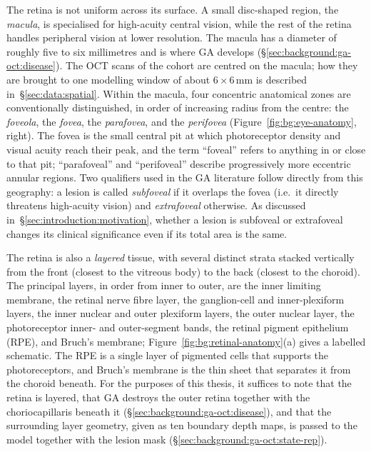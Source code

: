The retina is not uniform across its surface. A small disc-shaped
region, the \emph{macula}, is specialised for
high-acuity central vision, while the rest of the retina handles
peripheral vision at lower resolution. The macula has a diameter of
roughly five to six millimetres and is where GA develops
(\S\ref{sec:background:ga-oct:disease}). The OCT scans of the cohort are
centred on the macula; how they are brought to one modelling window of
about $6 \times 6$\,mm is described in~\S\ref{sec:data:spatial}. Within the macula, four
concentric anatomical zones are conventionally distinguished, in
order of increasing radius from the centre: the \emph{foveola}, the
\emph{fovea}, the \emph{parafovea}, and the \emph{perifovea}
(Figure~\ref{fig:bg:eye-anatomy}, right). The fovea is the small
central pit at which photoreceptor density and visual acuity reach
their peak, and the term ``foveal'' refers to anything in or close to
that pit; ``parafoveal'' and ``perifoveal'' describe progressively
more eccentric annular regions. Two qualifiers used in the GA
literature follow directly from this geography: a lesion is called
\emph{subfoveal} if it overlaps the fovea (i.e.\ it directly threatens
high-acuity vision) and \emph{extrafoveal} otherwise. As discussed
in~\S\ref{sec:introduction:motivation}, whether a lesion is subfoveal or
extrafoveal changes its clinical significance even if its
total area is the same.

The retina is also a \emph{layered} tissue, with several distinct
strata stacked vertically from the front (closest to the vitreous
body) to the back (closest to the choroid). The principal layers, in
order from inner to outer, are the inner limiting membrane, the
retinal nerve fibre layer, the ganglion-cell and inner-plexiform
layers, the inner nuclear and outer plexiform layers, the outer
nuclear layer, the photoreceptor inner- and outer-segment bands, the
retinal pigment epithelium (RPE), and Bruch's membrane;
Figure~\ref{fig:bg:retinal-anatomy}(a) gives a labelled schematic.
The RPE is a single layer of pigmented cells that supports the
photoreceptors, and Bruch's membrane is the thin sheet that separates it
from the choroid beneath.
For the purposes of this thesis, it suffices to note that the retina is
layered, that GA destroys the outer retina together with the
choriocapillaris beneath it (\S\ref{sec:background:ga-oct:disease}), and
that the surrounding
layer geometry, given as ten boundary depth maps, is passed to the model
together with the lesion mask (\S\ref{sec:background:ga-oct:state-rep}).


